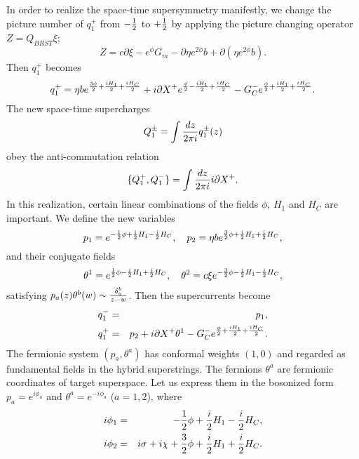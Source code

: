 \documentclass[a4paper,12pt]{article}
\begin{document}
In order to realize the space-time supersymmetry manifestly, we
change the picture number of $q^{+}_{1}$ from $-{1\over2}$ to
$+{1\over2}$ 
by applying the picture changing operator $Z=Q_{BRST}\xi$;
\begin{equation}
 Z=c\partial\xi-e^{\phi}G_{m}-\partial\eta e^{2\phi}b +\partial
(\eta e^{2\phi}b).
\end{equation}
Then $q^{+}_{1}$ becomes
\begin{equation}
 q_{1}^{+}
=\eta b e^{{3\phi\over2}+{i H_{1}\over2}+{i H_{C}\over2}}
+i\partial X^{+} e^{{\phi\over2}-{i H_{1}\over2}+{i H_{C}\over2}}
-G_{C}^{-}e^{{\phi\over2}+{i H_{1}\over2}+{i H_{C}\over2}}.
\end{equation}
The new space-time supercharges
\begin{equation}
Q^{\pm}_{1}=\int {dz\over 2\pi i} q_{1}^{\pm}(z)
\end{equation}
obey the anti-commutation relation
\begin{equation}
 \{ Q^{+}_{1}, Q^{-}_{1}\}=\int {dz\over 2\pi i}
i\partial X^{+}.
\label{eq:susy1}
\end{equation}
In this realization, certain linear combinations
of the fields $\phi$, $H_{1}$ and $H_{C}$ are important.
We define the new variables
\begin{equation}
 p_{1}=e^{-{1\over2}\phi+ {i\over 2}H_{1}- {i\over2} H_{C}},\quad
 p_{2}=\eta b e^{{3\over2}\phi+{i \over2}H_{1}+{i\over2}H_{C}},
\end{equation}
and their conjugate fields
\begin{equation}
\theta^{1}= e^{{1\over2}\phi-{i\over2}H_{1}+{i\over2}H_{C}}, \quad
 \theta^{2}=c\xi e^{-{3\over2}\phi-{i\over2}H_{1}-{i\over2}H_{C}},
\end{equation}
satisfying $p_{a}(z)\theta^{b}(w)\sim{\delta_{a}^{b}\over z-w}$.
Then the supercurrents become
\begin{eqnarray}
 q^{-}_{1}&=& p_{1}, \nonumber\\
 q^{+}_{1}&=&p_{2}+i\partial X^{+}\theta^{1}
-G_{C}^{-}e^{{\phi\over2}+{i H_{1}\over2}+{i H_{C}\over2}}.
\end{eqnarray}
The fermionic system $(p_{a},\theta^{a})$ has conformal weights $(1,0)$
and regarded as fundamental fields in the hybrid superstrings.
The fermions $\theta^{a}$ are
fermionic coordinates of target superspace.
Let us express them in the bosonized form $p_{a}=e^{i\phi_{a}}$
and $\theta^{a}=e^{-i\phi_{a}}$
($a=1,2$), 
where
\begin{eqnarray}
i \phi_{1}&=&  -{1\over2}\phi+{i\over2}H_{1}-{i\over2}H_{C},
\nonumber\\
i \phi_{2}&=& i\sigma+i\chi+{3\over2}\phi+{i\over2}H_{1}+{i\over2}H_{C}.
\end{eqnarray}
\end{document}
